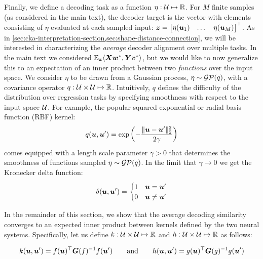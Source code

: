 Finally, we define a decoding task as a function $\eta : \mathcal{U} \mapsto \mathbb{R}$.
For $M$ finite samples (as considered in the main text), the decoder target is the vector with elements consisting of $\eta$ evaluated at each sampled input: ${\boldsymbol{z} = \begin{bmatrix} \eta(\boldsymbol{u}_1) & \dots & \eta(\boldsymbol{u}_M) \end{bmatrix}^\top}$.
As in \cref{sec:cka-interpretation-section,sec:shape-distance-connection}, we will be interested in characterizing the \textit{average} decoder alignment over multiple tasks.
In the main text we considered $\mathbb{E}_{\boldsymbol{z}} \langle \boldsymbol{X} \boldsymbol{w}^*, \boldsymbol{Y} \boldsymbol{v}^* \rangle$, but we would like to now generalize this to an expectation of an inner product between two \emph{functions} over the input space. 
We consider $\eta$ to be drawn from a Gaussian process, $\eta \sim \mathcal{G} \mathcal{P}(q)$, with a covariance operator $q: \mathcal{U} \times \mathcal{U} \mapsto \mathbb{R}$.
Intuitively, $q$ defines the difficulty of the distribution over regression tasks by specifying smoothness with respect to the input space $\mathcal{U}$.
For example, the popular squared exponential or radial basis function (RBF) kernel:
\begin{equation}
q(\boldsymbol{u}, \boldsymbol{u}^\prime) = \exp \left ( -\frac{\Vert \boldsymbol{u} - \boldsymbol{u}^\prime \Vert_2^2}{2 \gamma} \right )
\end{equation}
comes equipped with a length scale parameter $\gamma > 0$ that determines the smoothness of functions sampled $\eta \sim \mathcal{G} \mathcal{P}(q)$.
In the limit that $\gamma \rightarrow 0$ we get the Kronecker delta function:
\begin{equation}
\delta(\boldsymbol{u}, \boldsymbol{u}^\prime) = \begin{cases} 1 & \boldsymbol{u} = \boldsymbol{u}^\prime \\ 0 & \boldsymbol{u} \neq \boldsymbol{u}^\prime 
\end{cases}
\end{equation}

In the remainder of this section, we show that the average decoding similarity converges to an expected inner product between kernels defined by the two neural systems.
Specifically, let us define $k : \mathcal{U} \times \mathcal{U} \mapsto \mathbb{R}$ and $h : \mathcal{U} \times \mathcal{U} \mapsto \mathbb{R}$ as follows:

\begin{equation}
\label{eq:kernels-defined-by-neural-net}
k(\boldsymbol{u}, \boldsymbol{u}') = f(\boldsymbol{u})^\top \boldsymbol{G}(f)^{-1} f(\boldsymbol{u}') \qquad \text{and} \qquad h(\boldsymbol{u}, \boldsymbol{u}') = g(\boldsymbol{u})^\top \boldsymbol{G}(g)^{-1} g(\boldsymbol{u}')
\end{equation}

